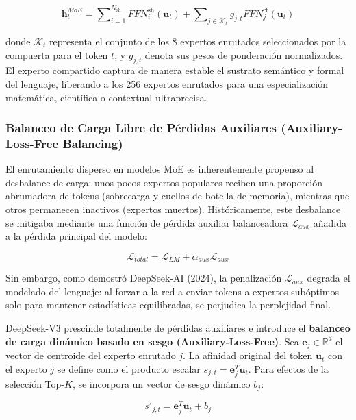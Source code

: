 \begin{equation}
\mathbf{h}_t^{MoE} = \sum\nolimits_{i=1}^{N_{\mathrm{sh}}} FFN_i^{\mathrm{sh}}(\mathbf{u}_t) + \sum\nolimits_{j \in \mathcal{K}_t} g_{j,t} FFN_j^{\mathrm{rt}}(\mathbf{u}_t)
\end{equation}

donde $\mathcal{K}_t$ representa el conjunto de los 8 expertos enrutados seleccionados por la compuerta para el token $t$, y $g_{j,t}$ denota sus pesos de ponderación normalizados. El experto compartido captura de manera estable el sustrato semántico y formal del lenguaje, liberando a los 256 expertos enrutados para una especialización matemática, científica o contextual ultraprecisa.

\subsubsection{Balanceo de Carga Libre de Pérdidas Auxiliares (Auxiliary-Loss-Free Balancing)}

El enrutamiento disperso en modelos MoE es inherentemente propenso al desbalance de carga: unos pocos expertos populares reciben una proporción abrumadora de tokens (sobrecarga y cuellos de botella de memoria), mientras que otros permanecen inactivos (expertos muertos). Históricamente, este desbalance se mitigaba mediante una función de pérdida auxiliar balanceadora $\mathcal{L}_{aux}$ añadida a la pérdida principal del modelo:

\begin{equation}
\mathcal{L}_{total} = \mathcal{L}_{LM} + \alpha_{aux} \mathcal{L}_{aux}
\end{equation}

Sin embargo, como demostró DeepSeek-AI (2024), la penalización $\mathcal{L}_{aux}$ degrada el modelado del lenguaje: al forzar a la red a enviar tokens a expertos subóptimos solo para mantener estadísticas equilibradas, se perjudica la perplejidad final.

DeepSeek-V3 prescinde totalmente de pérdidas auxiliares e introduce el \textbf{balanceo de carga dinámico basado en sesgo (Auxiliary-Loss-Free)}. Sea $\mathbf{e}_j \in \mathbb{R}^d$ el vector de centroide del experto enrutado $j$. La afinidad original del token $\mathbf{u}_t$ con el experto $j$ se define como el producto escalar $s_{j,t} = \mathbf{e}_j^T \mathbf{u}_t$. Para efectos de la selección Top-$K$, se incorpora un vector de sesgo dinámico $b_j$:

\begin{equation}
s'_{j,t} = \mathbf{e}_j^T \mathbf{u}_t + b_j
\end{equation}


